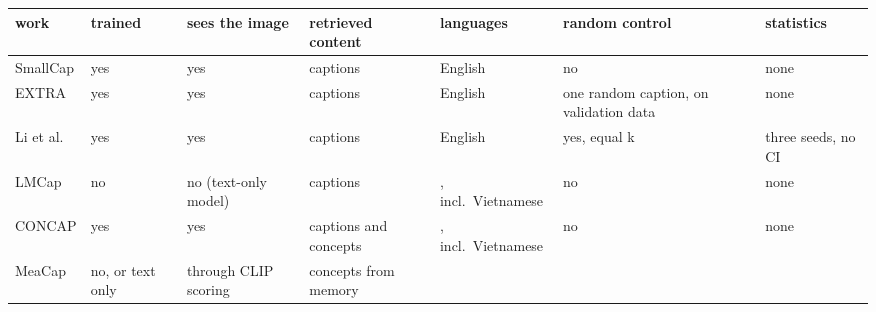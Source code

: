 \begin{longtable}[]{@{}
  >{\raggedright\arraybackslash}p{}
  >{\raggedright\arraybackslash}p{}
  >{\raggedright\arraybackslash}p{}
  >{\raggedright\arraybackslash}p{}
  >{\raggedright\arraybackslash}p{}
  >{\raggedright\arraybackslash}p{}
  >{\raggedright\arraybackslash}p{}@{}}
\toprule\noalign{}
\begin{minipage}[b]{\linewidth}\raggedright
work
\end{minipage} & \begin{minipage}[b]{\linewidth}\raggedright
trained
\end{minipage} & \begin{minipage}[b]{\linewidth}\raggedright
sees the image
\end{minipage} & \begin{minipage}[b]{\linewidth}\raggedright
retrieved content
\end{minipage} & \begin{minipage}[b]{\linewidth}\raggedright
languages
\end{minipage} & \begin{minipage}[b]{\linewidth}\raggedright
random control
\end{minipage} & \begin{minipage}[b]{\linewidth}\raggedright
statistics
\end{minipage} \\
\midrule\noalign{}
\endhead
\bottomrule\noalign{}
\endlastfoot
SmallCap \citep{Ramos2023SmallCap} & yes & yes & captions & English & no & none \\
EXTRA \citep{Ramos2023EXTRA} & yes & yes & captions & English & one random caption, on validation
data & none \\
Li et al. \citep{Li2024RetrievalRobustness} & yes & yes & captions & English & yes, equal k & three
seeds, no CI \\
LMCap \citep{Ramos2023LMCap} & no & no (text-only model) & captions & 36, incl.~Vietnamese & no &
none \\
CONCAP \citep{Ibrahim2025CONCAP} & yes & yes & captions and concepts & 36, incl.~Vietnamese & no &
none \\
MeaCap \citep{Zeng2024MeaCap} & no, or text only & through CLIP scoring & concepts from memory

\end{longtable}
